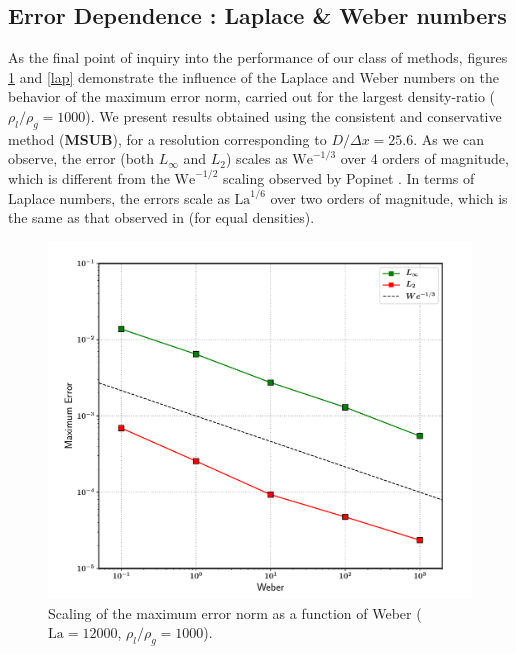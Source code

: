\subsection*{Error Dependence : Laplace \& Weber numbers}

As the final point of inquiry into the performance of our class of methods, figures \ref{web} and \ref{lap} demonstrate the influence of the Laplace and Weber numbers on the behavior of the maximum error norm, carried out for the largest density-ratio ($\rho_l/\rho_g = 1000$). We present results obtained using the consistent and conservative method (\textbf{MSUB}), for a resolution corresponding to $D / \Delta x = 25.6$. As we can observe, the error (both $L_\infty$ and $L_2$) scales as $\textrm{We}^{-1/3}$ over 4 orders of magnitude, which is different from the $\textrm{We}^{-1/2}$ scaling observed by Popinet \cite{popinet2009accurate} . In terms of Laplace numbers, the errors scale as $\textrm{La}^{1/6}$ over two orders of magnitude, which is the same as that observed in \cite{popinet2009accurate} (for equal densities).

\begin{figure}
    \centering
    \includegraphics[width = 1.0\textwidth]{plots/droplet_advect/webers.pdf}
	\caption{ Scaling of the maximum error norm as a function of Weber ($\textrm{La} = 12000$, $\rho_l / \rho_g = 1000$). }
    \label{web}
\end{figure}

